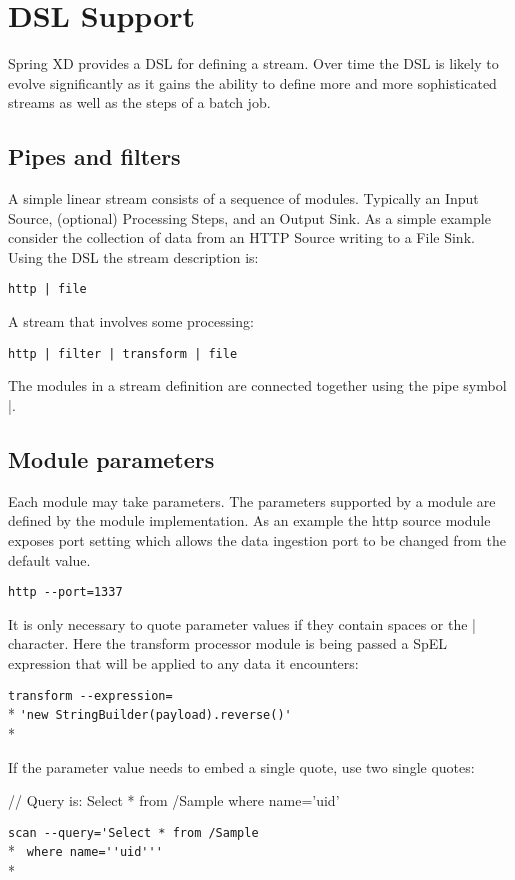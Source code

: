 \section{DSL Support}
Spring XD provides a DSL for defining a stream. Over time the DSL is likely to evolve significantly as it gains the ability to define more and more sophisticated streams as well as the steps of a batch job.
\subsection {Pipes and filters}
A simple linear stream consists of a sequence of modules. Typically an Input Source, (optional) Processing Steps, and an Output Sink. As a simple example consider the collection of data from an HTTP Source writing to a File Sink. Using the DSL the stream description is:

\verb;http | file;

A stream that involves some processing:

\verb;http | filter | transform | file;

The modules in a stream definition are connected together using the pipe symbol |.

\subsection{Module parameters}
Each module may take parameters. The parameters supported by a module are defined by the module implementation. As an example the http source module exposes port setting which allows the data ingestion port to be changed from the default value.

\verb;http --port=1337;

It is only necessary to quote parameter values if they contain spaces or the | character. Here the transform processor module is being passed a SpEL expression that will be applied to any data it encounters:

\verb;transform --expression=;\\*
 \verb;'new StringBuilder(payload).reverse()';\\* 

If the parameter value needs to embed a single quote, use two single quotes:

// Query is: Select * from /Sample where name='uid'

\verb;scan --query='Select * from /Sample;\\*
\verb; where name=''uid''';\\*

